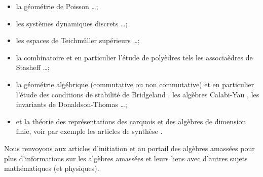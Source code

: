 \documentclass[brochure,12pt]{bourbaki}
\numberwithin{equation}{subsection}
\numberwithin{theorem}{section}
\begin{document}
\begin{itemize}

\item la g\'eom\'etrie de Poisson
\cite{GekhtmanShapiroVainshtein03}
\cite{GekhtmanShapiroVainshtein05}
\cite{GekhtmanShapiroVainshtein08}
\cite{BerensteinZelevinsky05} \ldots ;

\item les syst\`emes dynamiques discrets
\cite{FominZelevinsky03b}
\cite{Kedem08}
\cite{DiFrancescoKedem08}
\cite{InoueIyamaKunibaNakanishiSuzuki08} \ldots ;


\item les espaces de Teichm\"uller sup\'erieurs
\cite{FockGoncharov03}
\cite{FockGoncharov07b}
\cite{FockGoncharov06}
\cite{FockGoncharov09}
\ldots ;

\item la combinatoire et en particulier l'\'etude de
poly\`edres tels les associa\`edres de Sta\-sheff
\cite{ChapotonFominZelevinsky02}
\cite{Chapoton04}
\cite{IngallsThomas06}
\cite{Krattenthaler06}
\cite{FominReading05}
\cite{FominShapiroThurston08}
\cite{Musiker07}
\cite{MusikerSchifflerWilliams09}
\ldots ;

\item la g\'eom\'etrie alg\'ebrique (commutative ou
non commutative) et en particulier l'\'etude des
conditions de stabilit\'e de Bridgeland
\cite{Bridgeland07},
les alg\`ebres Calabi-Yau
\cite{IyamaReiten08} \cite{Ginzburg06},
les invariants de Donaldson-Thomas
\cite{JoyceSong09}
\cite{KontsevichSoibelman08}
\cite{Reineke09}
\cite{GaiottoMooreNeitzke09}
\ldots ;

\item et la th\'eorie des repr\'esentations des carquois
et des alg\`ebres de dimension finie, voir par exemple
les articles de synth\`ese
\cite{BuanMarsh06} \cite{Reiten06} \cite{Ringel07}
\cite{GeissLeclercSchroeer08a}
\cite{Keller08c}.
\end{itemize}
Nous renvoyons aux articles d'initiation
\cite{FominZelevinsky03a}
\cite{Zelevinsky04}
\cite{Zelevinsky02}
\cite{Zelevinsky05}
\cite{Zelevinsky07a}
et au portail des alg\`ebres amass\'ees \cite{Fomin07}
pour plus d'informations sur les alg\`ebres amass\'ees et
leurs liens avec d'autres sujets math\'ematiques
(et physiques).
\end{document}
